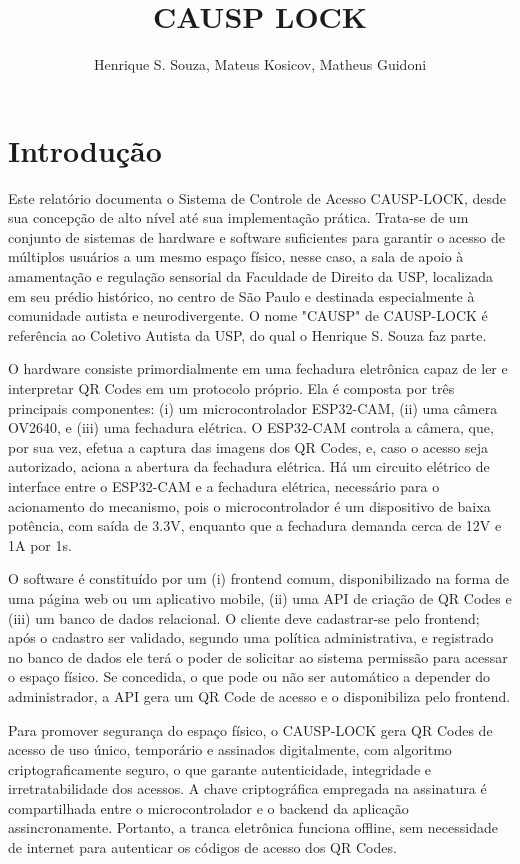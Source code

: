 \documentclass[12pt, letterpaper, twoside]{article}
\begin{document}
\title{CAUSP LOCK}
\author{Henrique S. Souza, Mateus Kosicov, Matheus Guidoni}

\maketitle

\section{Introdução}
Este relatório documenta o Sistema de Controle de Acesso CAUSP-LOCK, desde sua concepção de alto nível até sua implementação prática. Trata-se de um conjunto de sistemas de hardware e software suficientes para garantir o acesso de múltiplos usuários a um mesmo espaço físico, nesse caso, a sala de apoio à amamentação e regulação sensorial da Faculdade de Direito da USP, localizada em seu prédio histórico, no centro de São Paulo e destinada especialmente à comunidade autista e neurodivergente. O nome "CAUSP" de CAUSP-LOCK é referência ao Coletivo Autista da USP, do qual o Henrique S. Souza faz parte.

O hardware consiste primordialmente em uma fechadura eletrônica capaz de ler e interpretar QR Codes em um protocolo próprio. Ela é composta por três principais componentes: (i) um microcontrolador ESP32-CAM, (ii) uma câmera OV2640, e (iii) uma fechadura elétrica. O ESP32-CAM controla a câmera, que, por sua vez, efetua a captura das imagens dos QR Codes, e, caso o acesso seja autorizado, aciona a abertura da fechadura elétrica. Há um circuito elétrico de interface entre o ESP32-CAM e a fechadura elétrica, necessário para o acionamento do mecanismo, pois o microcontrolador é um dispositivo de baixa potência, com saída de 3.3V, enquanto que a fechadura demanda cerca de 12V e 1A por 1s.

O software é constituído por um (i) frontend comum, disponibilizado na forma de uma página web ou um aplicativo mobile, (ii) uma API de criação de QR Codes e (iii) um banco de dados relacional. O cliente deve cadastrar-se pelo frontend; após o cadastro ser validado, segundo uma política administrativa, e registrado no banco de dados ele terá o poder de solicitar ao sistema permissão para acessar o espaço físico. Se concedida, o que pode ou não ser automático a depender do administrador, a API gera um QR Code de acesso e o disponibiliza pelo frontend.

Para promover segurança do espaço físico, o CAUSP-LOCK gera QR Codes de acesso de uso único, temporário e assinados digitalmente, com algoritmo criptograficamente seguro, o que garante autenticidade, integridade e irretratabilidade dos acessos. A chave criptográfica empregada na assinatura é compartilhada entre o microcontrolador e o backend da aplicação assincronamente. Portanto, a tranca eletrônica funciona offline, sem necessidade de internet para autenticar os códigos de acesso dos QR Codes.
\end{document}
